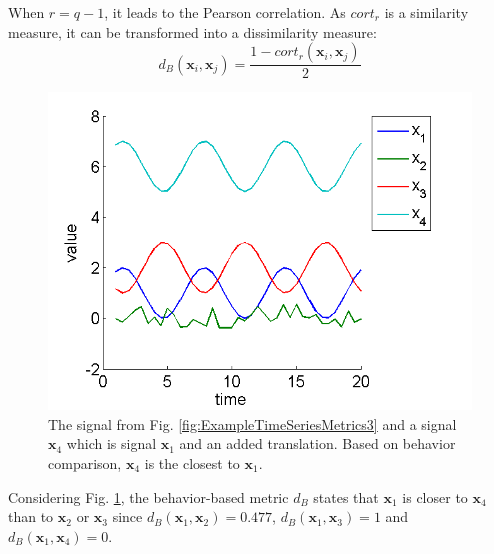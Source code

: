When $r=q-1$, it leads to the Pearson correlation. As $cort_r$ is a similarity measure, it can be transformed into a dissimilarity measure:
\begin{equation}
	d_B(\textbf{x}_i,\textbf{x}_j) = \frac{1 - cort_r(\textbf{x}_i,\textbf{x}_j)}{2}
	\label{eq:B}
\end{equation}

\begin{figure}[h!]
	\centering
	\includegraphics[width=0.7\linewidth]{images/ExampleTimeSeriesMetrics4}
	\caption[4 toys time series in the temporal domain.]{The signal from Fig. \ref{fig:ExampleTimeSeriesMetrics3} and a signal $\textbf{x}_4$ which is signal $\textbf{x}_1$ and an added translation. Based on behavior comparison, $\textbf{x}_4$ is the closest to $\textbf{x}_1$.}
	\label{fig:ExampleTimeSeriesMetrics4}
\end{figure}

\noindent Considering Fig. \ref{fig:ExampleTimeSeriesMetrics4}, the behavior-based metric $d_B$ states that $\textbf{x}_1$ is closer to $\textbf{x}_4$ than to $\textbf{x}_2$ or $\textbf{x}_3$ since $d_B(\textbf{x}_1,\textbf{x}_2) = 0.477$,  
$d_B(\textbf{x}_1,\textbf{x}_3) = 1$ and  
$d_B(\textbf{x}_1,\textbf{x}_4) = 0$. 



